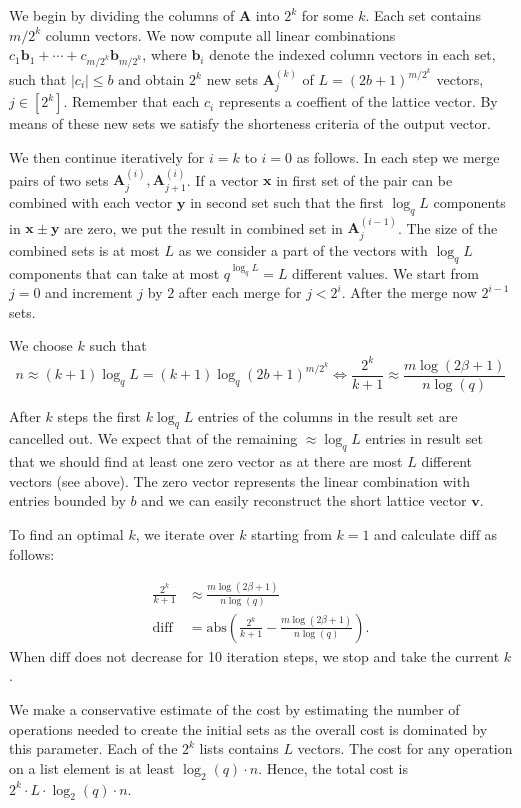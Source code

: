 We begin by dividing the columns of $\mathbf{A}$ into $2^k$ for some $k$. Each set contains $m/2^k$ column vectors. We now compute all linear combinations $c_1 \mathbf{b}_1 + \cdots + c_{m/2^k}\mathbf{b}_{m/2^k}$, where $\mathbf{b}_i$ denote the indexed column vectors in each set, such that $|c_i| \leq b$ and obtain $2^k$ new sets $\mathbf{A}_j^{(k)}$ of $L=(2b+1)^{m/2^k}$ vectors, $j\in \left[2^k\right]$. Remember that each $c_i$ represents a coeffient of the lattice vector. By means of these new sets we satisfy the shorteness criteria of the output vector.

We then continue iteratively for $i=k$ to $i=0$ as follows. In each step we merge pairs of two sets $\mathbf{A}_j^{(i)}, \mathbf{A}_{j+1}^{(i)}$. If a vector $\mathbf{x}$ in first set of the pair can be combined with each vector $\mathbf{y}$ in second set such that the first $\log_q L$ components in $\mathbf{x} \pm \mathbf{y}$ are zero, we put the result in combined set in $\mathbf{A}_j^{(i-1)}$. The size of the combined sets is at most $L$ as we consider a part of the vectors with $\log_q L$ components that can take at most $q^{\log_q L} = L$ different values. We start from $j=0$ and increment $j$ by $2$ after each merge for $j<2^i$.
After the merge now $2^{i-1}$ sets.

We choose $k$ such that
\begin{equation}
  n \approx (k+1) \log_q L = (k+1) \log_q (2b+1)^{m/2^k} \iff \frac{2^k}{k+1} \approx \frac{m \log(2\beta + 1)}{n \log(q)}
\end{equation}

After $k$ steps the first $k \log_q L$ entries of the columns in the result set are cancelled out. We expect that of the remaining $\approx \log_q L$ entries in result set that we should find at least one zero vector as at there are most $L$ different vectors (see above). The zero vector represents the linear combination with entries bounded by $b$ and we can easily reconstruct the short lattice vector $\mathbf{v}$.

To find an optimal $k$, we iterate over $k$ starting from $k=1$ and calculate $\text{diff}$ as follows:

\begin{align}
  \frac{2^k}{k+1} & \approx \frac{m \log(2\beta + 1)}{n \log(q)}                                     \\
  \text{diff}     & = \text{abs}\left(\frac{2^k}{k+1} - \frac{m \log(2\beta + 1)}{n \log(q)}\right).
\end{align}
When $\text{diff}$ does not decrease for 10 iteration steps, we stop and take the current $k$. %

We make a conservative estimate of the cost by estimating the number of operations needed to create the initial sets as the overall cost is dominated by this parameter. Each of the $2^k$ lists contains $L$ vectors. The cost for any operation on a list element is at least $\log_2(q) \cdot n$. Hence, the total cost is $2^k \cdot L \cdot \log_2(q) \cdot n$. %



